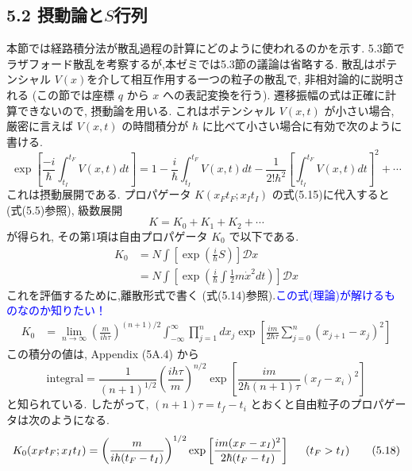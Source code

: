 \documentclass[a4paper,12pt]{article}
\begin{document}
\subsection*{\textrm{5.2 摂動論と$S$行列}}
本節では経路積分法が散乱過程の計算にどのように使われるのかを示す. 5.3節でラザフォード散乱を考察するが,本ゼミでは5.3節の議論は省略する. 散乱はポテンシャル $V(x)$を介して相互作用する一つの粒子の散乱で, 非相対論的に説明される (この節では座標 $q$ から $x$ への表記変換を行う). 遷移振幅の式は正確に計算できないので, 摂動論を用いる. これはポテンシャル $V(x, t)$ が小さい場合, 厳密に言えば $V(x, t)$ の時間積分が $\hbar$ に比べて小さい場合に有効で次のように書ける.
\begin{equation*}
    \exp\left[ \frac{-i}{\hbar} \int_{t_I}^{t_F} V(x, t)dt \right] = 1 - \frac{i}{\hbar} \int_{t_I}^{t_F} V(x, t)dt - \frac{1}{2!\hbar^2}\left[ \int_{t_I}^{t_F} V(x, t)dt \right]^2 + \cdots \tag{5.16}
\end{equation*} 
これは摂動展開である. プロパゲータ $K(x_{F}t_{F}; x_{I}t_{I})$ の式(5.15)に代入すると (式(5.5)参照), 級数展開
\begin{equation*}
    K = K_0 + K_1 + K_2 + \cdots \tag{5.17}
\end{equation*}
が得られ, その第1項は自由プロパゲータ $K_0$ で以下である.
\begin{align*}
    K_0 &= N \int \left[ \exp \left( \frac{i}{\hbar}S \right) \right]\mathcal{D}x\\
    &= N \int \left[ \exp \left( \frac{i}{\hbar}\int \frac{1}{2}m\dot{x}^2 dt \right) \right]\mathcal{D}x
\end{align*}
これを評価するために,離散形式で書く (式(5.14)参照).\textcolor{blue}{この式(理論)が解けるものなのか知りたい！}
\begin{align*}
    K_0 &= \lim_{n \rightarrow \infty} \left( \frac{m}{ih\tau} \right)^{(n+1)/2} \int_{-\infty}^{\infty} \prod_{j=1}^{n}dx_{j} \exp\left[ \frac{im}{2\hbar\tau}\sum_{j=0}^{n} (x_{j+1} - x_{j})^2 \right]
\end{align*}
この積分の値は, Appendix (5A.4) から
\begin{equation*}
    \textrm{integral} = \frac{1}{(n+1)^{1/2}}\left( \frac{ih\tau}{m} \right)^{n/2} \exp\left[ \frac{im}{2\hbar (n+1)\tau} (x_{f} - x_{i})^2 \right]
\end{equation*}
と知られている. したがって, $(n + 1)\tau = t_{f} - t_{i}$ とおくと自由粒子のプロパゲータは次のようになる.
\begin{equation*}
    K_{0}(x_{F}t_{F}; x_{I}t_{I}) = \left( \frac{m}{ih(t_{F} - t_{I})} \right)^{1/2}\exp\left[ \frac{im(x_{F} - x_{I})^2 }{2\hbar(t_{F} - t_{I})} \right]\hspace{0.5cm} (t_{F} > t_I) \tag{5.18}
\end{equation*}
\end{document}
